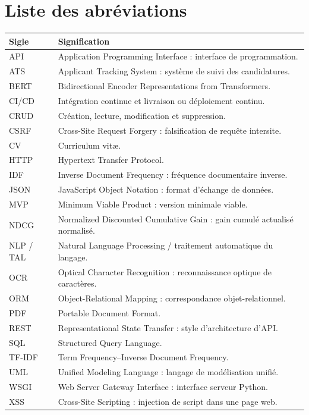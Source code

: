 \chapter*{Liste des abréviations}
\begingroup
\small
{}
\begin{longtable}{@{}P{2.5cm}P{11.8cm}@{}}
\toprule\textbf{Sigle} & \textbf{Signification}\\\midrule\endhead
API & Application Programming Interface : interface de programmation.\\
ATS & Applicant Tracking System : système de suivi des candidatures.\\
BERT & Bidirectional Encoder Representations from Transformers.\\
CI/CD & Intégration continue et livraison ou déploiement continu.\\
CRUD & Création, lecture, modification et suppression.\\
CSRF & Cross-Site Request Forgery : falsification de requête intersite.\\
CV & Curriculum vitæ.\\
HTTP & Hypertext Transfer Protocol.\\
IDF & Inverse Document Frequency : fréquence documentaire inverse.\\
JSON & JavaScript Object Notation : format d'échange de données.\\
MVP & Minimum Viable Product : version minimale viable.\\
NDCG & Normalized Discounted Cumulative Gain : gain cumulé actualisé normalisé.\\
NLP / TAL & Natural Language Processing / traitement automatique du langage.\\
OCR & Optical Character Recognition : reconnaissance optique de caractères.\\
ORM & Object-Relational Mapping : correspondance objet-relationnel.\\
PDF & Portable Document Format.\\
REST & Representational State Transfer : style d'architecture d'API.\\
SQL & Structured Query Language.\\
TF-IDF & Term Frequency--Inverse Document Frequency.\\
UML & Unified Modeling Language : langage de modélisation unifié.\\
WSGI & Web Server Gateway Interface : interface serveur Python.\\
XSS & Cross-Site Scripting : injection de script dans une page web.\\
\bottomrule
\end{longtable}
\endgroup

